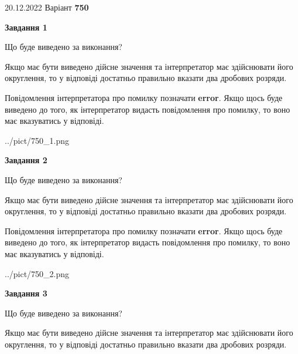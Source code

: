\documentclass[12pt, ukrainian]{article}
\begin{document}
{20.12.2022 Варіант \No \textbf { 750 }\par}
{
\begin {Large}

{\begin {center}\textbf{Завдання 1}\end {center}}\par
Що буде виведено за виконання? \par

Якщо має бути виведено дійсне значення та інтерпретатор має здійснювати його округлення, 
то у відповіді достатньо правильно вказати два дробових розряди.

Повідомлення інтерпретатора про помилку позначати \textbf{error}.
Якщо щось буде виведено до того, як інтерпретатор видасть повідомлення про помилку, 
то воно має вказуватись у відповіді. \par

\begin{center}
	{../pict/750_1.png}
\end{center}
\newpage

{\begin {center}\textbf{Завдання 2}\end {center}}\par
Що буде виведено за виконання? \par

Якщо має бути виведено дійсне значення та інтерпретатор має здійснювати його округлення, 
то у відповіді достатньо правильно вказати два дробових розряди.

Повідомлення інтерпретатора про помилку позначати \textbf{error}.
Якщо щось буде виведено до того, як інтерпретатор видасть повідомлення про помилку, 
то воно має вказуватись у відповіді. \par

\begin{center}
	{../pict/750_2.png}
\end{center}
\newpage

{\begin {center}\textbf{Завдання 3}\end {center}}\par
Що буде виведено за виконання? \par

Якщо має бути виведено дійсне значення та інтерпретатор має здійснювати його округлення, 
то у відповіді достатньо правильно вказати два дробових розряди.


\end{Large}}
\end{document}
